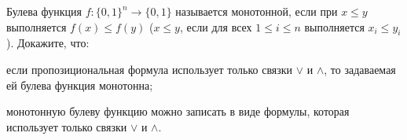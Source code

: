 Булева функция $f: \{0, 1\}^n \to \{0, 1\}$ называется монотонной, если при $x \le y$ выполняется $f(x) \le f(y)$ ($x \le
y$, если для всех $1 \le i \le n$ выполняется $x_i \le y_i$). Докажите, что:
\begin{enumcyr}
    \item если пропозициональная формула использует только связки $\lor$ и $\land$, то задаваемая ей булева функция
	    монотонна;
    \item монотонную булеву функцию можно записать в виде формулы, которая использует только связки $\lor$ и $\land$.
\end{enumcyr}